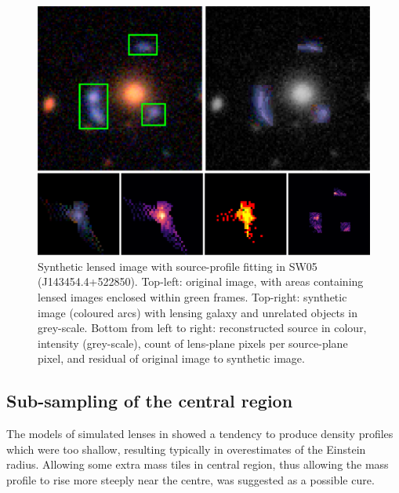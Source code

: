 \begin{figure}
  \includegraphics[width=\linewidth]{img/new_synth_img_detailed}
  \caption{Synthetic lensed image with source-profile fitting in SW05
    (J143454.4+522850). Top-left: original image, with areas
    containing lensed images enclosed within green frames.  Top-right:
    synthetic image (coloured arcs) with lensing galaxy and unrelated
    objects in grey-scale.  Bottom from left to right: reconstructed
    source in colour, intensity (grey-scale), count of lens-plane
    pixels per source-plane pixel, and residual of original image to
    synthetic image.}
  \label{fig:synthimg}
\end{figure}

\subsection{Sub-sampling of the central region}\label{subsec:hires}

The models of simulated lenses in \cite{2015MNRAS.447.2170K} showed a
tendency to produce density profiles which were too shallow, resulting
typically in overestimates of the Einstein radius. Allowing some extra
mass tiles in central region, thus allowing the mass profile to rise
more steeply near the centre, was suggested as a possible cure.

